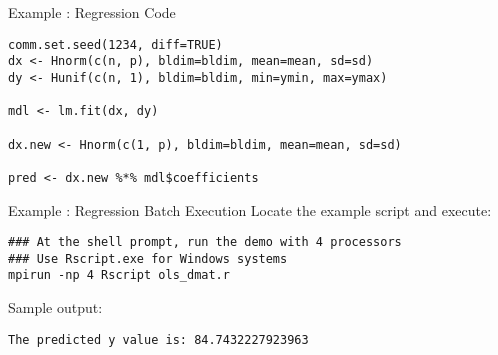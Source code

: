 \begin{frame}[fragile]
  \begin{exampleblock}{Example \showex :  Regression Code}\pause
\begin{lstlisting}
comm.set.seed(1234, diff=TRUE)
dx <- Hnorm(c(n, p), bldim=bldim, mean=mean, sd=sd)
dy <- Hunif(c(n, 1), bldim=bldim, min=ymin, max=ymax)

mdl <- lm.fit(dx, dy)

dx.new <- Hnorm(c(1, p), bldim=bldim, mean=mean, sd=sd)

pred <- dx.new %*% mdl$coefficients
\end{lstlisting}
  \end{exampleblock}
\end{frame}


\begin{frame}[fragile]
  \begin{exampleblock}{Example \showex :  Regression Batch Execution}\pause
  Locate the  example script  and execute:
\vspace{-.4cm}
  \begin{lstlisting}[language=Sh]
### At the shell prompt, run the demo with 4 processors
### Use Rscript.exe for Windows systems
mpirun -np 4 Rscript ols_dmat.r
\end{lstlisting}
Sample output:\vspace{-.4cm}
\begin{lstlisting}[language=Sh]
The predicted y value is: 84.7432227923963 
\end{lstlisting}
  \end{exampleblock}
\end{frame}